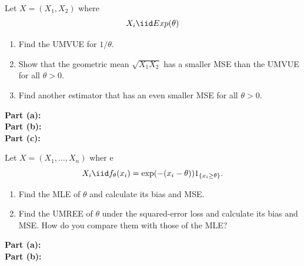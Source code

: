 \documentclass{article}
\begin{document}
\MakeAssignmentTitle

\begin{homeworkProblem}
  Let $X = (X_1, X_2)$ where
  \[
    X_i \iid Exp(\theta)
  \]
  \begin{enumerate}[label=(\alph*), topsep=5pt, itemsep=5pt]
    \item Find the UMVUE for $1/\theta$.
    \item Show that the geometric mean $\sqrt{X_1 X_2}$ has a smaller MSE than the UMVUE for all $\theta > 0$.
    \item Find another estimator that has an even smaller MSE for all $\theta > 0$. \newline
  \end{enumerate}

  \solution

  \textbf{Part (a):} \\

  \textbf{Part (b):} \\

  \textbf{Part (c):} \\




\end{homeworkProblem}

\pagebreak

\begin{homeworkProblem}
  Let $X = (X_1, \ldots, X_n)$ wher e
  \[
    X_i \iid f_\theta(x_i) = \exp(-(x_i - \theta)) 1_{\{ x_i \geq \theta \}}.
  \]
  \begin{enumerate}[label=(\alph*), topsep=5pt, itemsep=5pt]
    \item Find the MLE of $\theta$ and calculate its bias and MSE.
    \item Find the UMREE of $\theta$ under the squared-error loss and calculate its bias and MSE. How do you compare them with those of the MLE? \newline
  \end{enumerate}

  \solution

  \textbf{Part (a):} \\

  \textbf{Part (b):} \\

\end{homeworkProblem}
\end{document}
